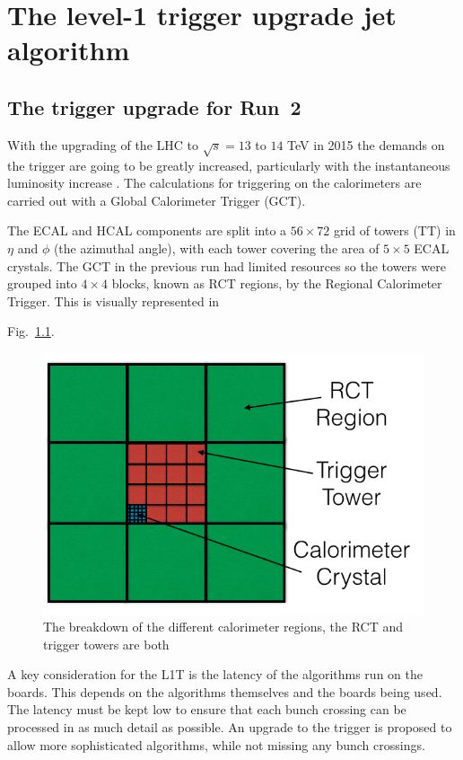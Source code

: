 \chapter{The level-1 trigger upgrade jet algorithm}
\label{chap:l1trig}

\section{The trigger upgrade for Run~2}
\label{sec:trigUpgrade}

With the upgrading of the LHC to $\sqrt{s}=13$ to $14$ TeV in 2015 the
demands on the trigger are going to be greatly increased, particularly
with the instantaneous luminosity increase
\cite{TriggerTDR_Tapper:2013yva}. The calculations for triggering on
the calorimeters are carried out with a Global Calorimeter Trigger
(GCT). 

The ECAL and HCAL components are split into a $56\times 72$
grid of towers (TT) in $\eta$ and $\phi$ (the azimuthal angle), with
each tower covering the area of $5\times5$ ECAL crystals. The GCT in
the previous run had limited resources so the towers were grouped into
$4\times4$ blocks, known as RCT regions, by the Regional Calorimeter
Trigger. This is visually represented in

Fig.~\ref{fig:trigger_calorimeter}.
\begin{figure}
	\begin{center}
		\includegraphics[width=0.4\linewidth]{figs/trigger/trigger_calorimeter}
	\end{center}
	\caption{The breakdown of the different calorimeter regions, the RCT
  and trigger towers are both }
	\label{fig:trigger_calorimeter}
\end{figure}

A key consideration for the L1T is the latency of the algorithms run
on the boards. This depends on the algorithms themselves and the
boards being used. The latency must be kept low to ensure that each
bunch crossing can be processed in as much detail as possible. An
upgrade to the trigger is proposed to allow more sophisticated
algorithms, while not missing any bunch crossings. 

